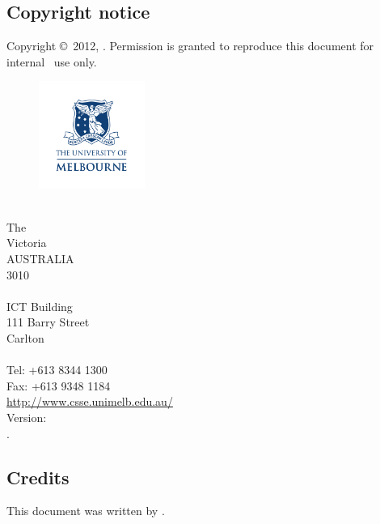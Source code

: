 

\subsection*{Copyright notice}

Copyright \copyright~2012, \team.
Permission is granted to reproduce this document for internal \team~use only.

\begin{figure}
	\begin{flushleft}
    	\includegraphics[height=35mm]{figs/UOM_logo}
	\end{flushleft}
\end{figure}
\csse\\
The \UoM\\
Victoria\\
AUSTRALIA\\
3010\\
\\
ICT Building\\
111 Barry Street\\
Carlton\\
\\
Tel: +613 8344 1300\\
Fax: +613 9348 1184\\
\url{http://www.csse.unimelb.edu.au/}\\

Version: \revision \\
\vdate. \\



\subsection*{Credits}

This document was written by \authors.

